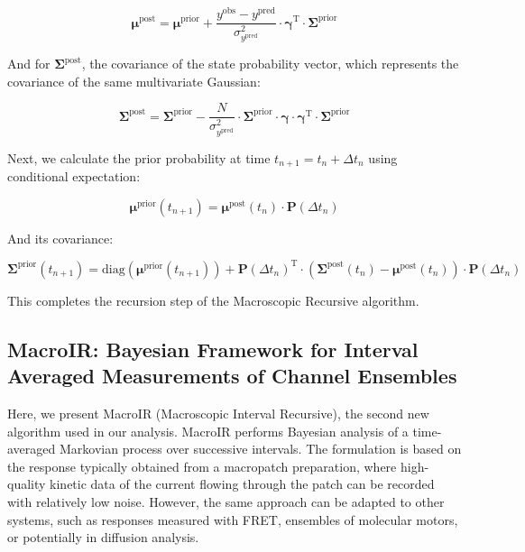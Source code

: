 \documentclass[pdflatex,sn-mathphys-num]{sn-jnl}%
\theoremstyle{thmstyleone}%
\theoremstyle{thmstyletwo}%
\theoremstyle{thmstylethree}%
\begin{document}
\begin{equation}
	\boldsymbol{\mu}^{\text{post}} = \boldsymbol{\mu}^{\text{prior}} + \frac{y^{\text{obs}} - y^{\text{pred}}}{\sigma^2_{y^{\text{pred}}}} \cdot \boldsymbol{\gamma}^{\mathrm{T}} \cdot \boldsymbol{\Sigma}^{\text{prior}}
	\label{eq:macro_mean_posterior}
\end{equation}

And for \( \boldsymbol{\Sigma}^{\text{post}} \), the covariance of the state probability vector, which represents the covariance of the same multivariate Gaussian:

\begin{equation}
	\boldsymbol{\Sigma}^{\text{post}} = \boldsymbol{\Sigma}^{\text{prior}} - \frac{N}{\sigma^2_{y^{\text{pred}}}} \cdot \boldsymbol{\Sigma}^{\text{prior}} \cdot \boldsymbol{\gamma} \cdot \boldsymbol{\gamma}^{\mathrm{T}} \cdot \boldsymbol{\Sigma}^{\text{prior}}
	\label{eq:macro_cov_posterior}
\end{equation}

Next, we calculate the prior probability at time \( t_{n+1} = t_n + \Delta t_n \) using conditional expectation:

\begin{equation}
	\boldsymbol{\mu}^{\text{prior}}(t_{n+1}) = \boldsymbol{\mu}^{\text{post}}(t_n) \cdot \mathbf{P}(\Delta t_n)
	\label{eq:macro_mean_next_prior}
\end{equation}

And its covariance:

\begin{equation}
	\boldsymbol{\Sigma}^{\text{prior}}(t_{n+1}) = \mathrm{diag}(\boldsymbol{\mu}^{\text{prior}}(t_{n+1})) + \mathbf{P}(\Delta t_n)^{\mathrm{T}} \cdot \left( \boldsymbol{\Sigma}^{\text{post}}(t_n) - \boldsymbol{\mu}^{\text{post}}(t_n) \right) \cdot \mathbf{P}(\Delta t_n)
	\label{eq:macro_mean_next_cov}
\end{equation}

This completes the recursion step of the Macroscopic Recursive algorithm.



\subsection{MacroIR: Bayesian Framework for Interval Averaged Measurements of Channel Ensembles}

Here, we present MacroIR (Macroscopic Interval Recursive), the second new algorithm used in our analysis. MacroIR performs Bayesian analysis of a time-averaged Markovian process over successive intervals. The formulation is based on the response typically obtained from a macropatch preparation, where high-quality kinetic data of the current flowing through the patch can be recorded with relatively low noise. However, the same approach can be adapted to other systems, such as responses measured with FRET, ensembles of molecular motors, or potentially in diffusion analysis.
\end{document}
